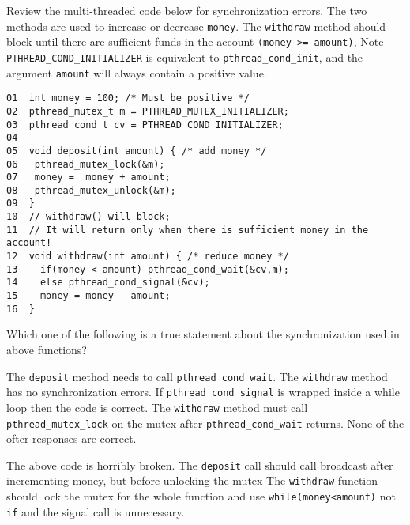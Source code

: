 \variant
Review the multi-threaded code below for synchronization errors. The two methods are used to increase or decrease {\tt money}. The {\tt withdraw} method should block until there are sufficient funds in the account {\tt (money >= amount)}, Note {\tt PTHREAD_COND_INITIALIZER} is equivalent to {\tt pthread_cond_init}, and the argument {\tt amount} will always contain a positive value.
\begin{verbatim}
01  int money = 100; /* Must be positive */
02  pthread_mutex_t m = PTHREAD_MUTEX_INITIALIZER;
03  pthread_cond_t cv = PTHREAD_COND_INITIALIZER; 
04
05  void deposit(int amount) { /* add money */
06   pthread_mutex_lock(&m);
07   money =  money + amount;
08   pthread_mutex_unlock(&m);
09  }
10  // withdraw() will block;
11  // It will return only when there is sufficient money in the account!
12  void withdraw(int amount) { /* reduce money */
13    if(money < amount) pthread_cond_wait(&cv,m);
14    else pthread_cond_signal(&cv);
15    money = money - amount;
16  }
\end{verbatim}

Which one of the following is a true statement about the synchronization used in above functions?
\begin{answers}
\answer The {\tt deposit} method needs to call {\tt pthread_cond_wait}.
\answer The {\tt withdraw} method has no synchronization errors.
\answer If {\tt pthread_cond_signal} is wrapped inside a while loop then the code is correct.
\answer The {\tt withdraw} method must call {\tt pthread_mutex_lock} on the mutex after {\tt pthread_cond_wait} returns.
\correctanswer None of the ofter responses are correct.
\end{answers}
\begin{solution}
The above code is horribly broken. The {\tt deposit} call should call broadcast after incrementing money, but before unlocking the mutex
The  {\tt withdraw} function should lock the mutex for the whole function and use {\tt while(money<amount)} not {\tt if} and the signal call is unnecessary.
\end{solution}




